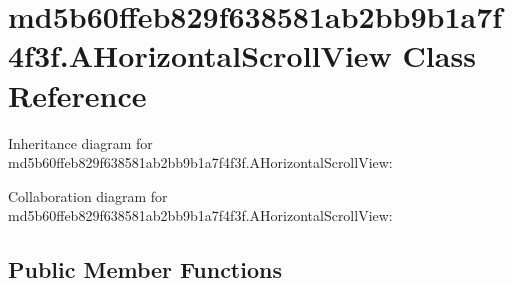 \hypertarget{classmd5b60ffeb829f638581ab2bb9b1a7f4f3f_1_1_a_horizontal_scroll_view}{}\section{md5b60ffeb829f638581ab2bb9b1a7f4f3f.\+A\+Horizontal\+Scroll\+View Class Reference}
\label{classmd5b60ffeb829f638581ab2bb9b1a7f4f3f_1_1_a_horizontal_scroll_view}


Inheritance diagram for md5b60ffeb829f638581ab2bb9b1a7f4f3f.\+A\+Horizontal\+Scroll\+View\+:


Collaboration diagram for md5b60ffeb829f638581ab2bb9b1a7f4f3f.\+A\+Horizontal\+Scroll\+View\+:
\subsection*{Public Member Functions}

